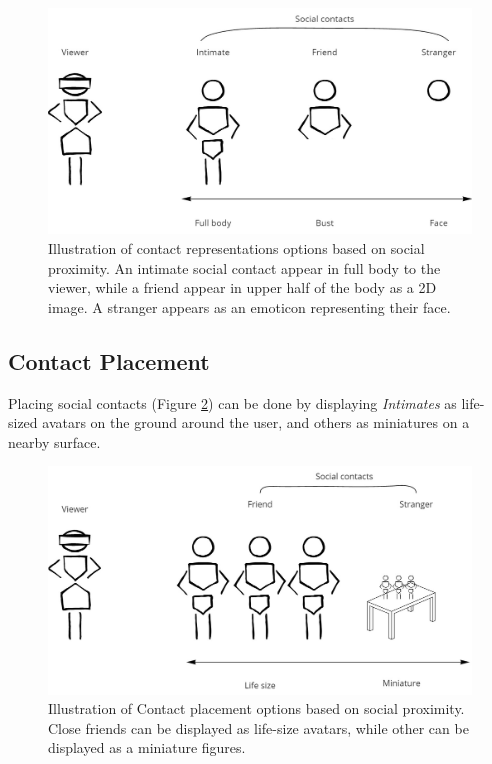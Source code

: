 \begin{figure}[ht]
    \centering
    \includegraphics[width=0.8\linewidth]{images/30-continuum/Continuum-representation.jpg}
    \caption{Illustration of contact representations options based on social proximity. An intimate social contact appear in full body to the viewer, while a friend appear in upper half of the body as a 2D image. A stranger appears as an emoticon representing their face.}
    \label{fig:continuum:contact-representations}
\end{figure}


\subsection{Contact Placement}

Placing social contacts (Figure \ref{fig:continuum:contact-placement}) can be done by displaying \textit{Intimates} as life-sized avatars on the ground around the user, and others as miniatures on a nearby surface. 

\begin{figure}[ht]
    \centering
    \includegraphics[width=0.8\linewidth]{images/30-continuum/Continuum-placement.jpg}
    \caption{Illustration of Contact placement options based on social proximity. Close friends can be displayed as life-size avatars, while other can be displayed as a miniature figures.}
    \label{fig:continuum:contact-placement}
\end{figure}


